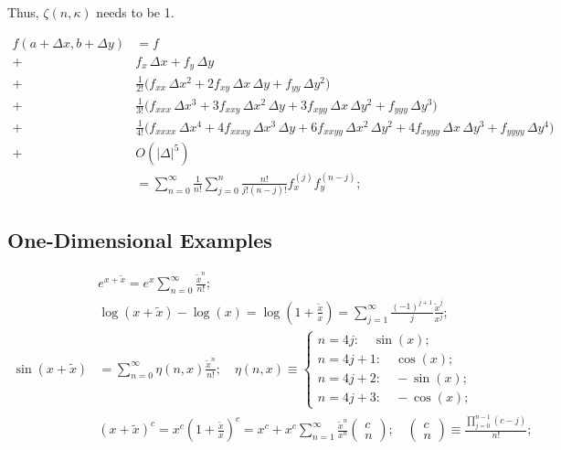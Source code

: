 \documentclass[twoside]{article}
\numberwithin{equation}{section}
\begin{document}
Thus, $\zeta(n, \kappa)$ needs to be 1.

\begin{align*}
f(a+\Delta x, b+\Delta y) &=
f \\
+& f_x\,\Delta x + f_y\,\Delta y \\
+& \tfrac{1}{2!}\bigl(f_{xx}\,\Delta x^{2} + 2 f_{xy}\,\Delta x\,\Delta y + f_{yy}\,\Delta y^{2}\bigr) \\
+& \tfrac{1}{3!}\bigl(f_{xxx}\,\Delta x^{3} + 3 f_{xxy}\,\Delta x^{2}\,\Delta y + 3 f_{xyy}\,\Delta x\,\Delta y^{2} + f_{yyy}\,\Delta y^{3}\bigr) \\
+& \tfrac{1}{4!}\bigl(f_{xxxx}\,\Delta x^{4} + 4 f_{xxxy}\,\Delta x^{3}\,\Delta y + 6 f_{xxyy}\,\Delta x^{2}\,\Delta y^{2} + 4 f_{xyyy}\,\Delta x\,\Delta y^{3} + f_{yyyy}\,\Delta y^{4}\bigr) \\
+& O(|\Delta|^{5}) \\
&= \sum_{n=0}^{\infty} \frac{1}{n!} \sum_{j=0}^{n} \frac{n!}{j! (n-j)!} f_x^{(j)} f_y^{(n - j)};
\end{align*}


\subsection{One-Dimensional Examples}
\begin{align}
\label{eqn: exp Taylor}
& e^{x + \tilde{x}} = e^x \sum_{n=0}^{\infty} \frac{\tilde{x}^n}{n!}; \\
\label{eqn: log Taylor}
& \log(x + \tilde{x}) - \log(x) = \log(1 + \frac{\tilde{x}}{x}) = \sum_{j=1}^{\infty} \frac{(-1)^{j+1}}{j} \frac{\tilde{x}^j}{x^j}; \\
\label{eqn: sin Taylor}
\sin(x + \tilde{x}) &= \sum_{n=0}^{\infty} \eta(n, x) \frac{\tilde{x}^{n}}{n!};
	\quad \eta(n, x) \equiv \begin{cases} 
		n = 4j: \quad  \sin(x); \\ n = 4j + 1: \quad  \cos(x); \\ n = 4j + 2: \quad  -\sin(x); \\ n = 4j +3: \quad  -\cos(x);
	\end{cases} \\
\label{eqn: power Taylor}
&(x + \tilde{x})^c = x^c (1 + \frac{\tilde{x}}{x})^c = x^c + x^c \sum_{n=1}^{\infty} \frac{\tilde{x}^n}{x^n} \begin{pmatrix} c \\ n \end{pmatrix};
	\quad \begin{pmatrix} c \\ n \end{pmatrix} \equiv \frac{\prod_{j=0}^{n-1} (c -j)}{n!};
\end{align}
\end{document}

